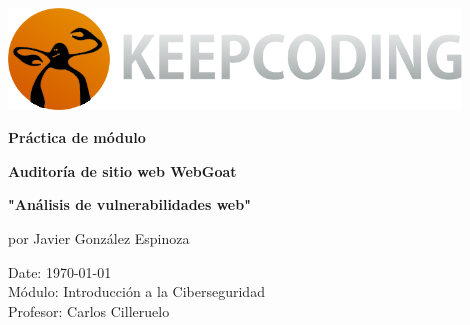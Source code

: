 \documentclass[12pt,oneside,a4paper]{book}
\makeatletter
\renewcommand{\headrulewidth}{0.2pt}
\renewcommand\tableofcontents{%
    \if@twocolumn
      \@restonecoltrue\onecolumn
    \else
      \@restonecolfalse
    \fi
    \section*{\contentsname
        \@mkboth{%
           \MakeUppercase\contentsname}{\MakeUppercase\contentsname}}%
    \@starttoc{toc}%
    \if@restonecol\twocolumn\fi
    }
\makeatother
\begin{document}
\renewcommand{\headrulewidth}{0pt}








\begin{titlepage}
   \thispagestyle{fancy}
   \begin{center}
        \vspace{5em}
   
        \centering\includegraphics[width=12cm]{img/kp2.png}

        \vspace{5em}

        \huge{\textbf{Práctica de módulo}}

        \vspace{2em}
        
        \huge{\textbf{Auditoría de sitio web WebGoat \\}}
        
        \vspace{2em}
        
        \huge{\textbf{"Análisis de vulnerabilidades web"}}
        
        \vspace{3em}

        \Large{por Javier González Espinoza}

        \vspace{7em}
        
   \end{center}

    \normalsize{}
    \normalsize{Date: \today \\
     Módulo: Introducción a la Ciberseguridad \\
     Profesor: Carlos Cilleruelo}
    
\end{titlepage}

\renewcommand{\headrulewidth}{0.2pt}

\newpage

\tableofcontents

\newpage
\end{document}
